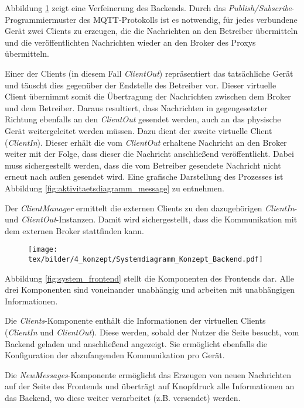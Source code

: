     
    Abbildung \ref{fig:system_backend} zeigt eine Verfeinerung des Backends. 
    Durch das \emph{Publish/Subscribe}-Programmiermuster des \ac{MQTT}-Protokolls ist es notwendig, für jedes verbundene Gerät zwei Clients zu erzeugen, die die Nachrichten an den Betreiber übermitteln und die veröffentlichten Nachrichten wieder an den Broker des Proxys übermitteln.
    
    Einer der Clients (in diesem Fall \emph{ClientOut}) repräsentiert das tatsächliche Gerät und täuscht dies gegenüber der Endstelle des Betreiber vor. Dieser virtuelle Client übernimmt somit die Übertragung der Nachrichten zwischen dem Broker und dem Betreiber. Daraus resultiert, dass Nachrichten in gegengesetzter Richtung ebenfalls an den \emph{ClientOut} gesendet werden, auch an das physische Gerät weitergeleitet werden müssen. Dazu dient der zweite virtuelle Client (\emph{ClientIn}). Dieser erhält die vom \emph{ClientOut} erhaltene Nachricht an den Broker weiter mit der Folge, dass dieser die Nachricht anschließend veröffentlicht. Dabei muss sichergestellt werden, dass die vom Betreiber gesendete Nachricht nicht erneut nach außen gesendet wird.
    Eine grafische Darstellung des Prozesses ist Abbildung \ref{fig:aktivitaetsdiagramm_message} zu entnehmen.
    
    Der \emph{ClientManager} ermittelt die externen Clients zu den dazugehörigen \emph{ClientIn}- und \emph{ClientOut}-Instanzen. Damit wird sichergestellt, dass die Kommunikation mit dem externen Broker stattfinden kann.

    \begin{figure}[h]%
        \centering
        \texttt{[image: tex/bilder/4\_konzept/Systemdiagramm\_Konzept\_Backend.pdf]}
        \label{fig:system_backend}
    \end{figure}
    
    Abbildung \ref{fig:system_frontend} stellt die Komponenten des Frontends dar. Alle drei Komponenten sind voneinander unabhängig und arbeiten mit unabhängigen Informationen.
    
    Die \emph{Clients}-Komponente enthält die Informationen der virtuellen Clients (\emph{ClientIn} und \emph{ClientOut}). Diese werden, sobald der Nutzer die Seite besucht, vom Backend geladen und anschließend angezeigt. Sie ermöglicht ebenfalls die Konfiguration der abzufangenden Kommunikation pro Gerät.
    
    Die \emph{NewMessages}-Komponente ermöglicht das Erzeugen von neuen Nachrichten auf der Seite des Frontends und überträgt auf Knopfdruck alle Informationen an das Backend, wo diese weiter verarbeitet (z.B. versendet) werden.
    

